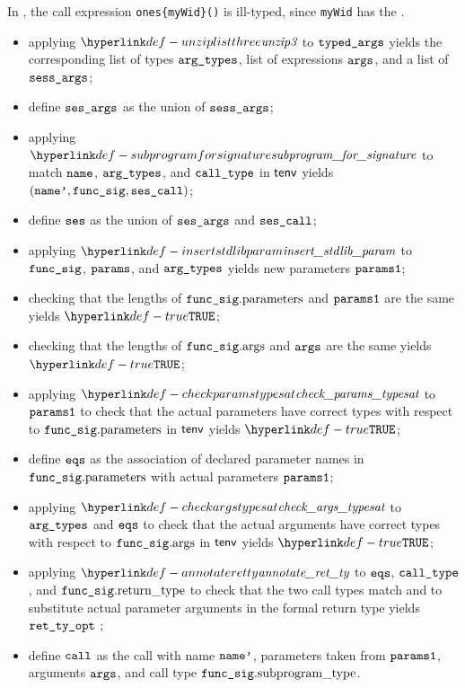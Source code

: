 In , the call expression \verb|ones{myWid}()|
is ill-typed, since \verb|myWid| has the \unconstrainedintegertype.

\ProseParagraph
\AllApply
\begin{itemize}
  \item applying $\unziplistthree$ to $\texttt{typed\_args}$ yields the corresponding list of types $\texttt{arg\_types}$,
        list of expressions $\texttt{args}$, and a list of \sideeffectdescriptorsetsterm\ $\texttt{sess\_args}$;
  \item define $\texttt{ses\_args}$ as the union of $\texttt{sess\_args}$;
  \item applying $\subprogramforsignature$ to match $\texttt{name}$, $\texttt{arg\_types}$, and $\texttt{call\_type}$ in $\textsf{tenv}$
        yields $(\texttt{name'}, \texttt{func\_sig}, \texttt{ses\_call})$\ProseOrTypeError;
  \item define $\texttt{ses}$ as the union of $\texttt{ses\_args}$ and $\texttt{ses\_call}$;
  \item applying $\insertstdlibparam$ to $\texttt{func\_sig}$, $\texttt{params}$, and $\texttt{arg\_types}$ yields new parameters $\texttt{params1}$;
  \item checking that the lengths of $\texttt{func\_sig}.\text{parameters}$ and $\texttt{params1}$ are the same yields $\True$\ProseTerminateAs{\BadCall};
  \item checking that the lengths of $\texttt{func\_sig}.\text{args}$ and $\texttt{args}$ are the same yields $\True$\ProseTerminateAs{\BadCall};
  \item applying $\checkparamstypesat$ to $\texttt{params1}$
        to check that the actual parameters have correct types with respect to $\texttt{func\_sig}.\text{parameters}$
        in $\textsf{tenv}$ yields $\True$\ProseOrTypeError;
  \item define $\texttt{eqs}$ as the association of declared parameter names in $\texttt{func\_sig}.\text{parameters}$ with actual parameters $\texttt{params1}$;
  \item applying $\checkargstypesat$ to $\texttt{arg\_types}$ and $\texttt{eqs}$
        to check that the actual arguments have correct types with respect to $\texttt{func\_sig}.\text{args}$
        in $\textsf{tenv}$ yields $\True$\ProseOrTypeError;
  \item applying $\annotateretty$ to $\texttt{eqs}$, $\texttt{call\_type}$, and $\texttt{func\_sig}.\text{return\_type}$
        to check that the two call types match and to substitute actual parameter arguments in the formal return type
        yields $\texttt{ret\_ty\_opt}$ \ProseOrTypeError;
  \item define $\texttt{call}$ as the call with name $\texttt{name'}$, parameters taken from $\texttt{params1}$, arguments $\texttt{args}$,
        and call type $\texttt{func\_sig}.\text{subprogram\_type}$.
\end{itemize}

